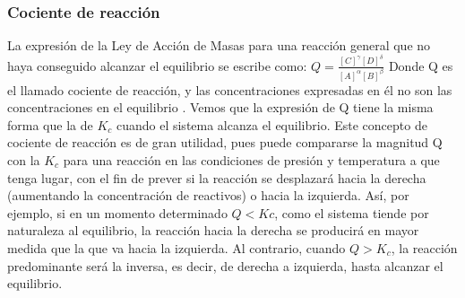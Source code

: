 \documentclass[11pt]{article}
\begin{document}
    \subsubsection{Cociente de reacci\'on}
        La expresión de la Ley de Acción de Masas para una reacción general que no haya conseguido alcanzar el equilibrio se escribe como: $Q  = \frac{[C]^\gamma[D]^\delta}{[A]^\alpha[B]^\beta} $
        Donde Q es el llamado cociente de reacción, y las concentraciones expresadas en él no son las concentraciones en el equilibrio \cite{whiten}. Vemos que la expresión de Q tiene la misma forma que la de $K_c$ cuando el sistema alcanza el equilibrio.
        Este concepto de cociente de reacción es de gran utilidad, pues puede compararse la magnitud Q con la $K_c$ para una reacción en las condiciones de presión y temperatura a que tenga lugar, con el fin de prever si la reacción se desplazará hacia la derecha (aumentando la concentración de reactivos) o hacia la izquierda. Así, por ejemplo, si en un momento determinado $Q < Kc$, como el sistema tiende por naturaleza al equilibrio, la reacción hacia la derecha se producirá en mayor medida que la que va hacia la izquierda. Al contrario, cuando $Q > K_c$, la reacción predominante será la inversa, es decir, de derecha a izquierda, hasta alcanzar el equilibrio.
\end{document}
